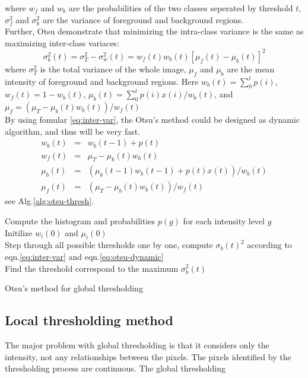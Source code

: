 \documentclass[b5,12pt]{report}
\begin{document}
where $w_f$ and $w_b$ are the probabilities of the two classes seperated by threshold $t$, $\sigma_f^2$ and $\sigma_b^2$ are the variance of foreground and background regions.\\
Further, Otsu demonstrate that minimizing the intra-class variance is the same as maximizing inter-class variaces:
\begin{equation} \label{eq:inter-var}
\sigma_b^2(t) = \sigma_T^2 - \sigma_w^2(t) = w_f(t)w_b(t)[\mu_f(t) - \mu_b(t)]^2
\end{equation}
where $\sigma_T^2$ is the total variance of the whole image, $\mu_f$ and $\mu_b$ are the mean intensity of foreground and background regions. Here $w_b(t) = \sum_0^tp(i)$, $w_f(t) = 1 - w_b(t)$, $\mu_b(t) = \sum_0^tp(i)x(i)/w_b(t)$, and $\mu_f = (\mu_T - \mu_b(t)w_b(t))/w_f(t)$\\
By using fomular \ref{eq:inter-var}, the Otsu's method could be designed as dynamic algorithm, and thus will be very fast. 
\begin{equation} \label{eq:otsu-dynamic}
\begin{array}{lll}
	w_b(t) & = & w_b(t-1) + p(t) \\
	w_f(t) & = & \mu_T - \mu_b(t)w_b(t) \\
	\mu_b(t) & = & (\mu_b(t-1)w_b(t-1) + p(t)x(t))/w_b(t)\\
	\mu_f(t) & = & (\mu_T - \mu_b(t)w_b(t))/w_f(t)
\end{array}
\end{equation}
see Alg.\ref{alg:otsu-thresh}.
\begin{algorithm}
\SetAlgoLined
{}
Compute the histogram and probabilities $p(g)$ for each intensity level $g$\\
Initilize $w_i(0)$ and $\mu_i(0)$\\
Step through all possible thresholds one by one, compute $\sigma_b(t)^2$ according to eqn.\ref{eq:inter-var} and eqn.\ref{eq:otsu-dynamic}\\
Find the threshold correspond to the maximum $\sigma_b^2(t)$
\caption{Otsu's method for global thresholding}
\label{alg:otsu-thresh}
\end{algorithm}
\subsection{Local thresholding method}
The major problem with global thresholding is that it considers only the intensity, not any relationships between the pixels. The pixels identified by the thresholding process are continuous. The global thresholding 
\end{document}
